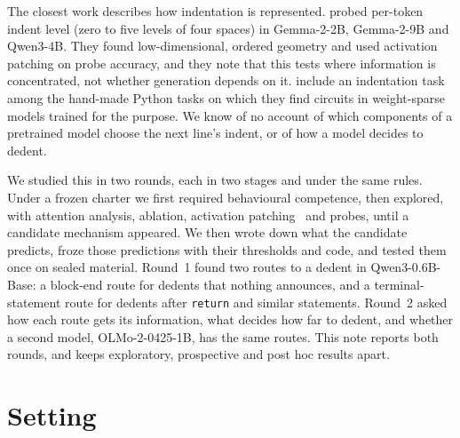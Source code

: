 \documentclass[11pt]{article}
\newcommand{\qw}{Qwen3-0.6B-Base}
\newcommand{\code}[1]{\texttt{#1}}
\begin{document}
The closest work describes how indentation is represented. \citet{bassi2026geometry} probed per-token indent level (zero to five levels of four spaces) in Gemma-2-2B, Gemma-2-9B and Qwen3-4B. They found low-dimensional, ordered geometry and used activation patching on probe accuracy, and they note that this tests where information is concentrated, not whether generation depends on it. \citet{gao2025weightsparse} include an indentation task among the hand-made Python tasks on which they find circuits in weight-sparse models trained for the purpose. We know of no account of which components of a pretrained model choose the next line's indent, or of how a model decides to dedent.

We studied this in two rounds, each in two stages and under the same rules. Under a frozen charter we first required behavioural competence, then explored, with attention analysis, ablation, activation patching~\citep{meng2022locating,heimersheim2024patching,zhang2024patching} and probes, until a candidate mechanism appeared. We then wrote down what the candidate predicts, froze those predictions with their thresholds and code, and tested them once on sealed material. Round~1 found two routes to a dedent in \qw{}: a block-end route for dedents that nothing announces, and a terminal-statement route for dedents after \code{return} and similar statements. Round~2 asked how each route gets its information, what decides how far to dedent, and whether a second model, OLMo-2-0425-1B, has the same routes. This note reports both rounds, and keeps exploratory, prospective and post hoc results apart.

\section{Setting}
\label{sec:setting}
\end{document}
